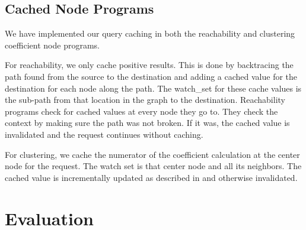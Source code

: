 \documentclass[letterpaper,twocolumn,11pt,tight]{article}
\begin{document}
\subsection{Cached Node Programs}
We have implemented our query caching in both the reachability and clustering coefficient node programs.

For reachability, we only cache positive results. This is done by backtracing the path found from the source to the destination and adding a cached value for the destination for each node along the path. The watch\_set for these cache values is the sub-path from that location in the graph to the destination. Reachability programs check for cached values at every node they go to. They check the context by making sure the path was not broken. If it was, the cached value is invalidated and the request continues without caching.

For clustering, we cache the numerator of the coefficient calculation at the center node for the request. The watch set is that center node and all its neighbors. The cached value is incrementally updated as described in  and otherwise invalidated.
\section{Evaluation}\label{sec:eval}
\end{document}
